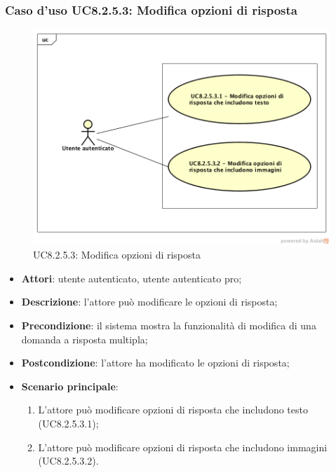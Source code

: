 \subsubsection{Caso d'uso UC8.2.5.3: Modifica opzioni di risposta}
	\label{UC8.2.5.3}
	\begin{figure}[h]
		\centering
			\includegraphics[scale=0.45,keepaspectratio]{UML/UC8_2_5_3.png}
		\caption{UC8.2.5.3: Modifica opzioni di risposta}
	\end{figure}
	\FloatBarrier
	\begin{itemize}
		\item
			\textbf{Attori}: utente autenticato, utente autenticato pro;
		\item		
			\textbf{Descrizione}: l'attore può modificare le opzioni di risposta;
		\item
			\textbf{Precondizione}: il sistema mostra la funzionalità di modifica di una domanda a risposta multipla;
		\item
			\textbf{Postcondizione}: l'attore ha modificato le opzioni di risposta;
		\item
			\textbf{Scenario principale}:
	       		\begin{enumerate}
	       			\item
	       			L'attore può modificare opzioni di risposta che includono testo (UC8.2.5.3.1);
					\item
					L'attore può modificare opzioni di risposta che includono immagini (UC8.2.5.3.2).
	 			\end{enumerate}
	\end{itemize}	
	
